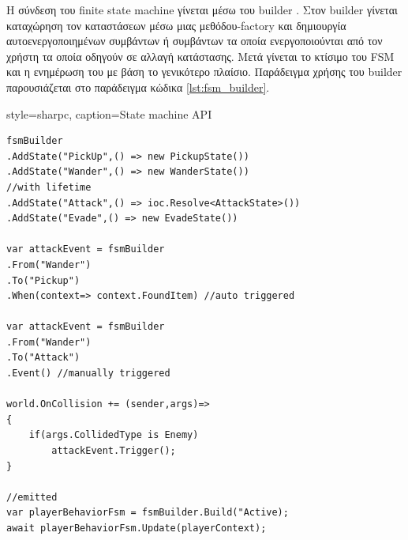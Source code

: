 H σύνδεση του finite state machine γίνεται μέσω του builder \cite{Gamma:1995:DPE:186897}. Στον builder γίνεται καταχώρηση τον καταστάσεων μέσω μιας μεθόδου-factory και δημιουργία αυτοενεργοποιημένων συμβάντων ή συμβάντων τα οποία ενεργοποιούνται από τον χρήστη τα οποία οδηγούν σε αλλαγή κατάστασης. Μετά γίνεται το κτίσιμο του FSM και η ενημέρωση του με βάση το γενικότερο πλαίσιο. Παράδειγμα χρήσης του builder παρουσιάζεται στο παράδειγμα κώδικα \ref{lst:fsm_builder}.

\lstset
{
	style=sharpc, 
	caption={State machine API}
}
\begin{lstlisting}[label=lst:fsm_builder]
fsmBuilder
.AddState("PickUp",() => new PickupState())
.AddState("Wander",() => new WanderState())
//with lifetime
.AddState("Attack",() => ioc.Resolve<AttackState>())
.AddState("Evade",() => new EvadeState())	
		
var attackEvent = fsmBuilder
.From("Wander")
.To("Pickup")
.When(context=> context.FoundItem) //auto triggered
	
var attackEvent = fsmBuilder
.From("Wander")
.To("Attack")
.Event() //manually triggered
	 	
world.OnCollision += (sender,args)=>
{
    if(args.CollidedType is Enemy)
	    attackEvent.Trigger();
}
	 
//emitted	 
var playerBehaviorFsm = fsmBuilder.Build("Active);
await playerBehaviorFsm.Update(playerContext);
	
\end{lstlisting}
